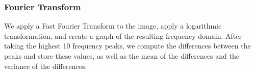 
\subsubsection{Fourier Transform}

We apply a Fast Fourier Transform to the image, apply a logarithmic transformation, and create a graph of the resulting frequency domain. After taking the highest 10 frequency peaks, we compute the differences between the peaks and store these values, as well as the mean of the differences and the variance of the differences. 

    
  